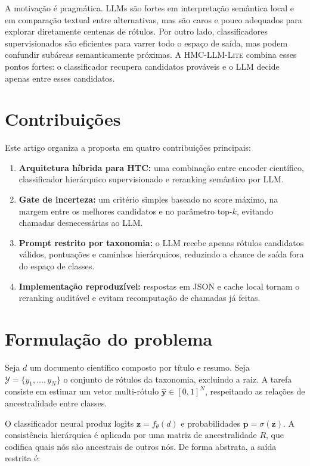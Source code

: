 \documentclass[11pt,a4paper]{article}
\newcommand{\method}{\textsc{HMC-LLM-Lite}}
\begin{document}
A motivação é pragmática. LLMs são fortes em interpretação semântica local e em
comparação textual entre alternativas, mas são caros e pouco adequados para
explorar diretamente centenas de rótulos. Por outro lado, classificadores
supervisionados são eficientes para varrer todo o espaço de saída, mas podem
confundir subáreas semanticamente próximas. A \method{} combina esses pontos
fortes: o classificador recupera candidatos prováveis e o LLM decide apenas entre
esses candidatos.

\section{Contribuições}

Este artigo organiza a proposta em quatro contribuições principais:

\begin{enumerate}[leftmargin=*, itemsep=2pt]
  \item \textbf{Arquitetura híbrida para HTC:} uma combinação entre encoder
        científico, classificador hierárquico supervisionado e reranking
        semântico por LLM.
  \item \textbf{Gate de incerteza:} um critério simples baseado no score máximo,
        na margem entre os melhores candidatos e no parâmetro top-$k$, evitando
        chamadas desnecessárias ao LLM.
  \item \textbf{Prompt restrito por taxonomia:} o LLM recebe apenas rótulos
        candidatos válidos, pontuações e caminhos hierárquicos, reduzindo a
        chance de saída fora do espaço de classes.
  \item \textbf{Implementação reproduzível:} respostas em JSON e cache local
        tornam o reranking auditável e evitam recomputação de chamadas já feitas.
\end{enumerate}

\section{Formulação do problema}

Seja $d$ um documento científico composto por título e resumo. Seja
$\mathcal{Y}=\{y_1,\dots,y_N\}$ o conjunto de rótulos da taxonomia, excluindo a
raiz. A tarefa consiste em estimar um vetor multi-rótulo
$\hat{\mathbf{y}}\in[0,1]^N$, respeitando as relações de ancestralidade entre
classes.

O classificador neural produz logits $\mathbf{z}=f_\theta(d)$ e probabilidades
$\mathbf{p}=\sigma(\mathbf{z})$. A consistência hierárquica é aplicada por uma
matriz de ancestralidade $R$, que codifica quais nós são ancestrais de outros
nós. De forma abstrata, a saída restrita é:
\end{document}
